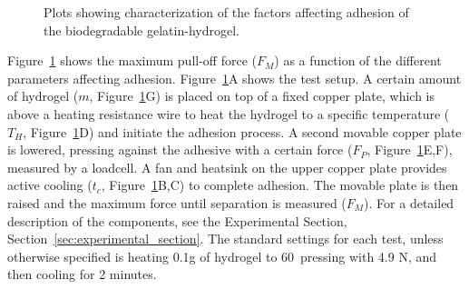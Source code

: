 \begin{figure}
{
}
  \caption{Plots showing characterization of the factors affecting adhesion of the biodegradable gelatin-hydrogel.}
  \label{fig:fig-2-plots-placeholder}

\end{figure}


Figure~\ref{fig:fig-2-plots-placeholder} shows the maximum pull-off force ($F_M$) as a function of the different parameters affecting adhesion. Figure~\ref{fig:fig-2-plots-placeholder}A shows the test setup. A certain amount of hydrogel ($m$, Figure~\ref{fig:fig-2-plots-placeholder}G) is placed on top of a fixed copper plate, which is above a heating resistance wire to heat the hydrogel to a specific temperature ($T_H$, Figure~\ref{fig:fig-2-plots-placeholder}D) and initiate the adhesion process. A second movable copper plate is lowered, pressing against the adhesive with a certain force ($F_P$, Figure~\ref{fig:fig-2-plots-placeholder}E,F), measured by a loadcell. 
A fan and heatsink on the upper copper plate provides active cooling ($t_c$, Figure~\ref{fig:fig-2-plots-placeholder}B,C) to complete adhesion. The movable plate is then raised and the maximum force until separation is measured ($F_M$).  For a detailed description of the components, see the Experimental Section, Section~\ref{sec:experimental_section}.%
 The standard settings for each test, unless otherwise specified is heating 0.1g of hydrogel to 60\degree\, pressing with 4.9 N, and then cooling for 2 minutes.

